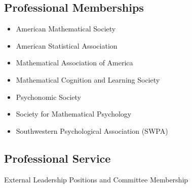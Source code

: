 \documentclass[article,10pt]{article}
\begin{document}
\subsection*{Professional Memberships}
\label{sec:org5fdaa88}
\begin{itemize}
\item American Mathematical Society
\item American Statistical Association
\item Mathematical Association of America
\item Mathematical Cognition and Learning Society
\item Psychonomic Society
\item Society for Mathematical Psychology
\item Southwestern Psychological Association (SWPA)
\end{itemize}

\subsection*{Professional Service}
\label{sec:org64a52cd}

External Leadership Positions and Committee Membership
\end{document}
